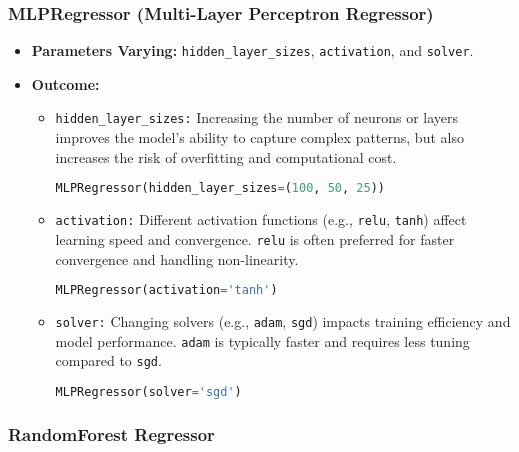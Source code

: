 \subsubsection*{MLPRegressor (Multi-Layer Perceptron Regressor)}

\begin{itemize}
    \item \textbf{Parameters Varying:} \texttt{hidden\_layer\_sizes}, \texttt{activation}, and \texttt{solver}.
    \item \textbf{Outcome:}
    \begin{itemize}
        \item \texttt{hidden\_layer\_sizes:} Increasing the number of neurons or layers improves the model's ability to capture complex patterns, but also increases the risk of overfitting and computational cost.
        \begin{lstlisting}[language=Python, caption=Increasing value of \texttt{hidden\_layer\_sizes}]
MLPRegressor(hidden_layer_sizes=(100, 50, 25))
        \end{lstlisting}
        \item \texttt{activation:} Different activation functions (e.g., \texttt{relu}, \texttt{tanh}) affect learning speed and convergence. \texttt{relu} is often preferred for faster convergence and handling non-linearity.
        \begin{lstlisting}[language=Python, caption=Changing the \texttt{activation} function]
MLPRegressor(activation='tanh')
        \end{lstlisting}
        \item \texttt{solver:} Changing solvers (e.g., \texttt{adam}, \texttt{sgd}) impacts training efficiency and model performance. \texttt{adam} is typically faster and requires less tuning compared to \texttt{sgd}.
        \begin{lstlisting}[language=Python, caption=Changing the \texttt{solver}]
MLPRegressor(solver='sgd')
		\end{lstlisting}
    \end{itemize}
\end{itemize}

\subsubsection*{RandomForest Regressor}

